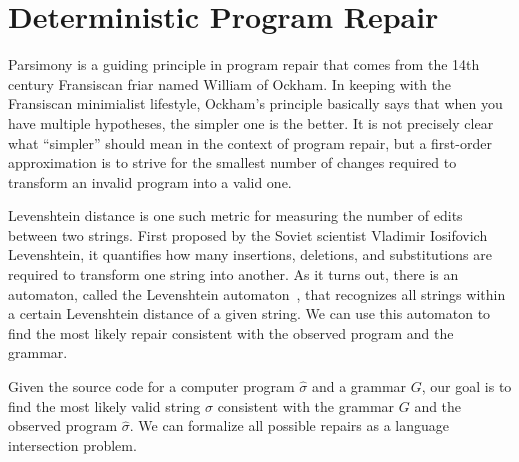 \chapter{\rm\bfseries Deterministic Program Repair}
\label{ch:chapter02}

Parsimony is a guiding principle in program repair that comes from the 14th century Fransiscan friar named William of Ockham. In keeping with the Fransiscan minimialist lifestyle, Ockham's principle basically says that when you have multiple hypotheses, the simpler one is the better. It is not precisely clear what ``simpler'' should mean in the context of program repair, but a first-order approximation is to strive for the smallest number of changes required to transform an invalid program into a valid one.

Levenshtein distance is one such metric for measuring the number of edits between two strings. First proposed by the Soviet scientist Vladimir Iosifovich Levenshtein, it quantifies how many insertions, deletions, and substitutions are required to transform one string into another. As it turns out, there is an automaton, called the Levenshtein automaton~\cite{schulz2002fast}, that recognizes all strings within a certain Levenshtein distance of a given string. We can use this automaton to find the most likely repair consistent with the observed program and the grammar.

Given the source code for a computer program $\hat\sigma$ and a grammar $G$, our goal is to find the most likely valid string $\sigma$ consistent with the grammar $G$ and the observed program $\hat\sigma$. We can formalize all possible repairs as a language intersection problem.

